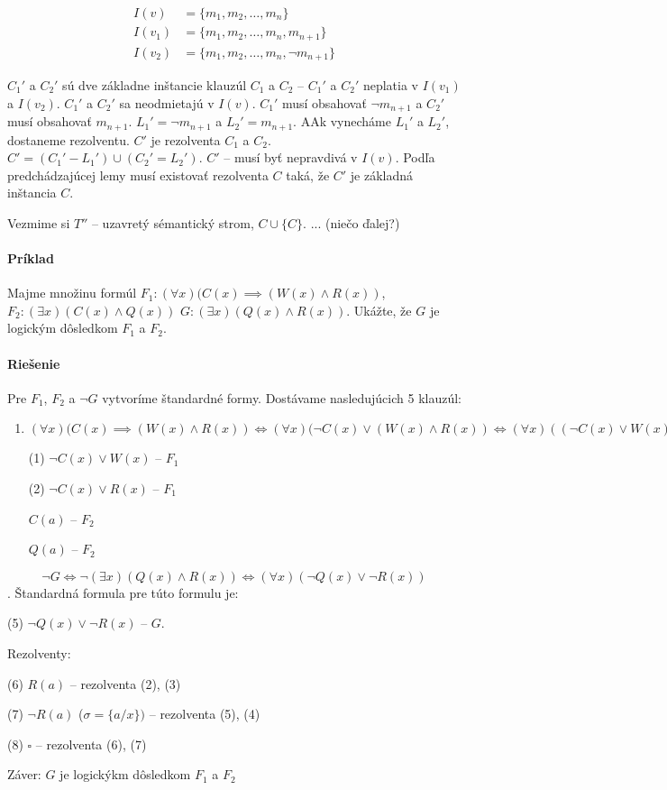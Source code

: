 \begin{dokaz}
\begin{itemize}
\begin{align*}
    I(v)    &= \{ m_1, m_2, \ldots, m_n \} \\
    I(v_1)  &= \{ m_1, m_2, \ldots, m_n, m_{n+1} \}  \\
    I(v_2)  &= \{ m_1, m_2, \ldots, m_n, \neg m_{n+1} \} 
\end{align*}

$C_1'$ a $C_2'$ sú dve základne inštancie klauzúl $C_1$ a $C_2$ -- $C_1'$ a
$C_2'$ neplatia v $I(v_1)$ a $I(v_2)$. $C_1'$ a $C_2'$ sa neodmietajú v $I(v)$.
$C_1'$ musí obsahovať $\neg m_{n+1}$ a $C_2'$ musí obsahovať $m_{n+1}$. $L_1' =
\neg m_{n+1}$ a $L_2' = m_{n+1}$. AAk vynecháme $L_1'$ a $L_2'$, dostaneme
rezolventu. $C'$ je rezolventa $C_1$ a $C_2$. $C' = (C_1' - L_1') \cup (C_2' =
L_2')$. $C'$ -- musí byť nepravdivá v $I(v)$. Podľa predchádzajúcej lemy musí
existovať rezolventa $C$ taká, že $C'$ je základná inštancia $C$.

\par Vezmime si $T''$ -- uzavretý sémantický strom, $C \cup \{C\}$. ... (niečo
ďalej?)
    \end{itemize}
\end{dokaz}

\paragraph{Príklad} Majme množinu formúl $F_1: (\forall x) (C(x) \implies (W(x)
\land R(x))$, $F_2: (\exists x)(C(x) \land Q(x))$ $G: (\exists x) (Q(x) \land
R(x))$. Ukážte, že $G$ je logickým dôsledkom $F_1$ a $F_2$.

\paragraph{Riešenie} Pre $F_1$, $F_2$ a $\neg G$ vytvoríme štandardné formy.
Dostávame nasledujúcich 5 klauzúl:
\begin{enumerate}
	\item $(\forall x) (C(x) \implies (W(x) \land R(x)) \iff (\forall
	x)(\neg C(x) \lor (W(x)\land R(x)) \iff (\forall x) ((\neg C(x) \lor
	W(x)) \land (\neg C(x) \lor R(x)))$
	\par (1) $\neg C(x) \lor W(x)$ -- $F_1$
	\par (2) $\neg C(x) \lor R(x)$ -- $F_1$
	\par $C(a)$ -- $F_2$
	\par $Q(a)$ -- $F_2$
\end{enumerate}
$$\neg G \iff \neg (\exists x)(Q(x)\land R(x)) \iff (\forall x) (\neg Q(x) \lor
\neg R(x)) $$. Štandardná formula pre túto formulu je:
\par (5) $\neg Q(x) \lor \neg R(x)$ -- $G$.

\par Rezolventy: 
\par (6) $R(a)$ -- rezolventa (2), (3)
\par (7) $\neg R(a)$ ($\sigma = \{a / x \})$ -- rezolventa (5), (4)
\par (8) $\square$ -- rezolventa (6), (7)

\par Záver: $G$ je logickýkm dôsledkom $F_1$ a $F_2$

